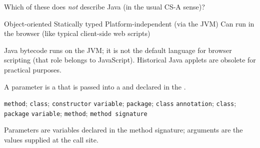 \newpage


\question[4]
Which of these does \emph{not} describe Java (in the usual CS-A sense)?
\begin{choices}
  \choice Object-oriented
  \choice Statically typed
  \choice Platform-independent (via the JVM)
  \CorrectChoice Can run in the browser (like typical client-side web scripts)
\end{choices}
\begin{solution}
  Java bytecode runs on the JVM; it is not the default language for browser scripting (that role belongs to JavaScript). Historical Java applets are obsolete for practical purposes.
\end{solution}

\question[4]
A parameter is a \blank[3.5em] that is passed into a \blank[3.5em] and declared in the \blank[3.5em].
\begin{choices}
  \choice \texttt{method}; \texttt{class}; \texttt{constructor}
  \choice \texttt{variable}; \texttt{package}; \texttt{class}
  \choice \texttt{annotation}; \texttt{class}; \texttt{package}
  \CorrectChoice \texttt{variable}; \texttt{method}; \texttt{method signature}
\end{choices}
\begin{solution}
  Parameters are variables declared in the method signature; arguments are the values supplied at the call site.
\end{solution}

